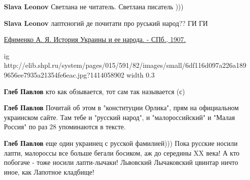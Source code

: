\begin{itemize}
\begin{itemize}
\textbf{Slava Leonov} Светлана не читатель. Светлана писатель )))

 
\textbf{Slava Leonov} \Smiley[1.0][yellow] лаптєногий де почитати про руський народ?? ГИ ГИ \Smiley[1.0][yellow]

\href{http://elib.shpl.ru/ru/nodes/14445-efimenko-a-ya-istoriya-ukrainy-i-ee-naroda-spb-1907}{
Ефименко А. Я. История Украины и ее народа. - СПб., 1907.}

\ifcmt
  ig http://elib.shpl.ru/system/pages/015/591/82/images/small/6df116d097a226a1899656ee7935a21354fe6eac.jpg?1414058902
  width 0.3
\fi

 
\textbf{Глеб Павлов} кто как обзывается, тот сам так называется (с)

 
\textbf{Глеб Павлов} Почитай об этом в "конституции Орлика", прям на официальном украинском сайте. Там тебе и "русский народ", и "малороссийский" и "Малая Россия" по раз 28 упоминаются в тексте.

 
\textbf{Глеб Павлов} еще один украинец с русской фамилией))) Пока русские носили лапти, малороссы все больше бегали босиком, аж до середины XX века! А кто побогаче - тоже носили лапти-лычаки! Львовский Лычаковский цвинтар ничто иное, как Лапотное кладбище!

 

\end{itemize}
\end{itemize}
